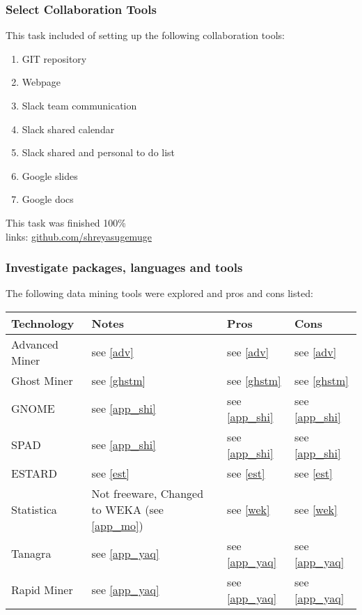 \documentclass[12pt]{article}
\begin{document}
	\subsubsection{Select Collaboration Tools}
	This task included of setting up the following collaboration tools:
	\begin{enumerate}
		\item GIT repository
		\item Webpage
		\item Slack team communication
		\item Slack shared calendar
		\item Slack shared and personal to do list
		\item Google slides
		\item Google docs
	\end{enumerate}
			This task was finished 100\% \\
		links: \url{github.com/shreyasugemuge}
	\subsubsection{Investigate packages, languages and tools}
	The following data mining tools were explored and pros and cons listed: \\ 
	
	\begin{tabularx}{\textwidth}{|X|X|X|X|}
	\hline
	\textbf{Technology} & \textbf{Notes} & \textbf{Pros} & \textbf{Cons} \\ \hline
	Advanced Miner & see \ref{adv}&see \ref{adv}& see \ref{adv}\\ \hline
	Ghost Miner & see \ref{ghstm} &  see \ref{ghstm}& see \ref{ghstm} \\ \hline
	GNOME & see \ref{app_shi} & see \ref{app_shi} & see \ref{app_shi}  \\ \hline
	SPAD & see \ref{app_shi} & see \ref{app_shi} & see \ref{app_shi}  \\ \hline
	ESTARD & see \ref{est} & see \ref{est} & see \ref{est}\\ \hline
	Statistica & Not freeware, Changed to WEKA (see \ref{app_mo}) & see \ref{wek} & see \ref{wek} \\ \hline
	Tanagra & see \ref{app_yaq} & see \ref{app_yaq} & see \ref{app_yaq} \\ \hline
	Rapid Miner & see \ref{app_yaq} & see \ref{app_yaq} & see \ref{app_yaq} \\ \hline
	\end{tabularx}
\end{document}
